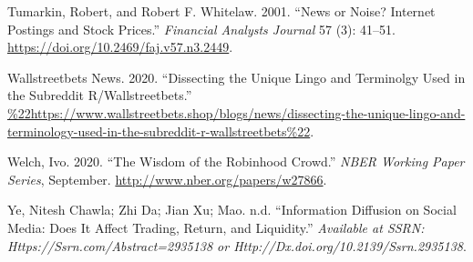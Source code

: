 \documentclass[12pt,]{article}
\begin{document}
\leavevmode\hypertarget{ref-tumarkin2001}{}%
Tumarkin, Robert, and Robert F. Whitelaw. 2001. ``News or Noise?
Internet Postings and Stock Prices.'' \emph{Financial Analysts Journal}
57 (3): 41--51. \url{https://doi.org/10.2469/faj.v57.n3.2449}.

\leavevmode\hypertarget{ref-wsbshop}{}%
Wallstreetbets News. 2020. ``Dissecting the Unique Lingo and Terminolgy
Used in the Subreddit R/Wallstreetbets.''
\url{\%22https://www.wallstreetbets.shop/blogs/news/dissecting-the-unique-lingo-and-terminology-used-in-the-subreddit-r-wallstreetbets\%22}.

\leavevmode\hypertarget{ref-welch2020}{}%
Welch, Ivo. 2020. ``The Wisdom of the Robinhood Crowd.'' \emph{NBER
Working Paper Series}, September.
\url{http://www.nber.org/papers/w27866}.

\leavevmode\hypertarget{ref-chawla2016}{}%
Ye, Nitesh Chawla; Zhi Da; Jian Xu; Mao. n.d. ``Information Diffusion on
Social Media: Does It Affect Trading, Return, and Liquidity.''
\emph{Available at SSRN: Https://Ssrn.com/Abstract=2935138 or
Http://Dx.doi.org/10.2139/Ssrn.2935138}.





\newpage
\singlespacing 
\end{document}
